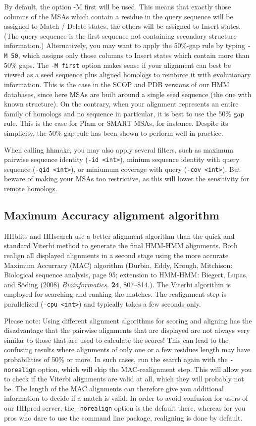 \documentclass[11pt,a4paper]{article}
\begin{document}
By default, the option -M first will be used. This means that exactly those columns of 
the MSAs which contain a residue in the query sequence will be assigned to Match 
/ Delete states, the others will be assigned to Insert states. (The query sequence is 
the first sequence not containing secondary structure information.) Alternatively, you 
may want to apply the 50\%-gap rule by typing \verb`-M 50`, which assigns only those columns 
to Insert states which contain more than 50\% gaps. The \verb`-M first` option makes sense 
if your alignment can best be viewed as a seed sequence plus aligned homologs to 
reinforce it with evolutionary information. This is the case in the SCOP and PDB 
versions of our HMM databases, since here MSAs are built around a single seed 
sequence (the one with known structure). On the contrary, when your alignment 
represents an entire family of homologs and no sequence in particular, it is best to 
use the 50\% gap rule. This is the case for Pfam or SMART MSAs, for instance. 
Despite its simplicity, the 50\% gap rule has been shown to perform well in practice.

When calling hhmake, you may also apply several filters, such as maximum pairwise 
sequence identity (\verb`-id <int>`), minium sequence identity with query sequence 
(\verb`-qid <int>`), or miniumum coverage with query (\verb`-cov <int>`). But beware 
of making your MSAs too restrictive, as this will lower the sensitivity for remote homologs.


\subsection{Maximum Accuracy alignment algorithm} \label{MAC}

HHblits and HHsearch use a better alignment algorithm than the quick and 
standard Viterbi method to generate the final HMM-HMM alignments. Both realign
all displayed alignments in a second stage using the more accurate Maximum Accurracy 
(MAC) algorithm (Durbin, Eddy, Krough, Mitchison: Biological sequence analysis, page 
95; extension to HMM-HMM: Biegert, Lupas, and S\"oding (2008) \emph{Bioinformatics.} 
\textbf{24}, 807--814.). The Viterbi algorithm is employed for searching and ranking the 
matches. The realignment step is parallelized (\verb`-cpu <int>`) and typically takes a 
few seconds only.    

Please note: Using different alignment algorithms for scoring and aligning has the 
disadvantage that the pairwise alignments that are displayed are not always very similar to 
those that are used to calculate the scores! This can lead to the confusing results 
where alignments of only one or a few residues length may have probabilities of 50\% 
or more. In such cases, run the search again with the \verb`-norealign` option, which will 
skip the MAC-realignment step. This will allow you to check if the Viterbi alignments 
are valid at all, which they will probably not be. The length of the MAC alignments 
can therefore give you additional information to decide if a match is valid. In order
to avoid confusion for users of our HHpred server, the \verb`-norealign` option is the 
default there, whereas for you pros who dare to use the command line package, 
realigning is done by default.
\end{document}
